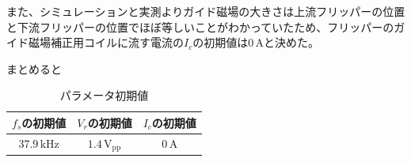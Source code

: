 また、シミュレーションと実測よりガイド磁場の大きさは上流フリッパーの位置と下流フリッパーの位置でほぼ等しいことがわかっていたため、フリッパーのガイド磁場補正用コイルに流す電流の$I_c$の初期値は$0\,\mathrm{A}$と決めた。

まとめると
\begin{table}[h]
\centering
\caption{パラメータ初期値}
\begin{tabular}{ccc}
$f_s$の初期値&$V_r$の初期値&$I_c$の初期値 \\ \hline
$37.9\,\mathrm{kHz}$&$1.4 \,\mathrm{V_{pp}}$&$0\,\mathrm{A}$
\end{tabular}
\end{table}



